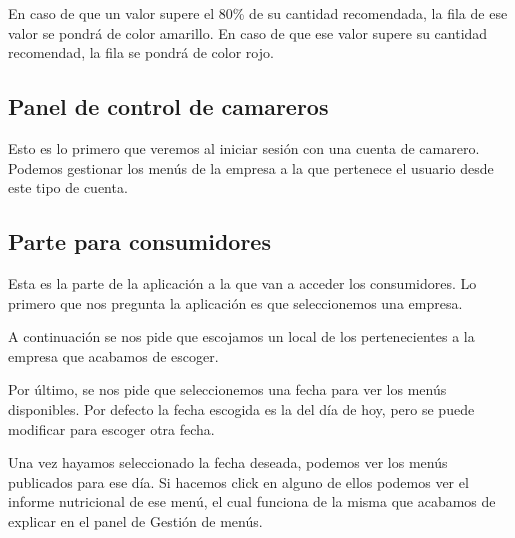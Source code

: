 
En caso de que un valor supere el 80\% de su cantidad recomendada, la fila de ese valor se pondrá de color amarillo. En caso de que ese valor supere su cantidad recomendad, la fila se pondrá de color rojo.


\subsection{Panel de control de camareros}

Esto es lo primero que veremos al iniciar sesión con una cuenta de camarero. Podemos gestionar los menús de la empresa a la que pertenece el usuario desde este tipo de cuenta.


\subsection{Parte para consumidores}

Esta es la parte de la aplicación a la que van a acceder los consumidores. Lo primero que nos pregunta la aplicación es que seleccionemos una empresa.


A continuación se nos pide que escojamos un local de los pertenecientes a la empresa que acabamos de escoger.


Por último, se nos pide que seleccionemos una fecha para ver los menús disponibles. Por defecto la fecha escogida es la del día de hoy, pero se puede modificar para escoger otra fecha.

Una vez hayamos seleccionado la fecha deseada, podemos ver los menús publicados para ese día. Si hacemos click en alguno de ellos podemos ver el informe nutricional de ese menú, el cual funciona de la misma que acabamos de explicar en el panel de Gestión de menús.




